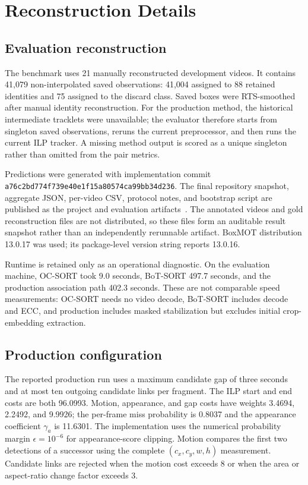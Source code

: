 \section{Reconstruction Details}
\label{sec:appendix}

\subsection{Evaluation reconstruction}

The benchmark uses 21 manually reconstructed development videos.  It contains 41,079 non-interpolated saved
observations: 41,004 assigned to 88 retained identities and 75 assigned to the
discard class.  Saved boxes were RTS-smoothed after manual identity reconstruction.
For the production method, the historical intermediate tracklets were unavailable;
the evaluator therefore starts from singleton saved observations, reruns the current
preprocessor, and then runs the current ILP tracker.  A missing method output is
scored as a unique singleton rather than omitted from the pair metrics.

Predictions were generated with implementation commit
\texttt{a76c2bd774f739e40e1f15a80574ca99bb34d236}.  The final repository snapshot,
aggregate JSON, per-video CSV, protocol notes, and bootstrap script are published as
the project and evaluation artifacts~\cite{projectresources}.
The annotated videos and gold reconstruction files are not distributed, so these
files form an auditable result snapshot rather than an independently rerunnable
artifact.  BoxMOT distribution 13.0.17 was used; its package-level version string
reports 13.0.16.

Runtime is retained only as an operational diagnostic.  On the evaluation machine,
OC-SORT took 9.0 seconds, BoT-SORT 497.7 seconds, and the production association path
402.3 seconds.  These are not comparable speed measurements: OC-SORT needs no video
decode, BoT-SORT includes decode and ECC, and production includes masked stabilization
but excludes initial crop-embedding extraction.

\subsection{Production configuration}

The reported production run uses a maximum candidate gap of three seconds and at
most ten outgoing candidate links per fragment.  The ILP start and end costs are both
96.0993.  Motion, appearance, and gap costs have weights 3.4694, 2.2492, and 9.9926;
the per-frame miss probability is 0.8037 and the appearance coefficient $\gamma_a$ is
11.6301.  The implementation uses the numerical probability margin
$\epsilon=10^{-6}$ for appearance-score clipping.  Motion compares the first two
detections of a successor using the complete $(c_x,c_y,w,h)$ measurement.  Candidate
links are rejected when the motion cost exceeds 8 or when the area or aspect-ratio
change factor exceeds 3.

